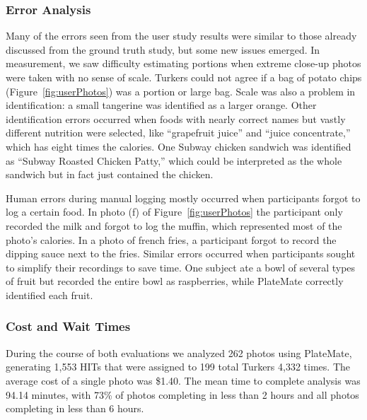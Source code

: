 \subsubsection{Error Analysis}
Many of the errors seen from the user study results were similar to those already discussed from the ground truth study, but some new issues emerged.  In measurement, we saw difficulty estimating portions when extreme close-up photos were taken with no sense of scale.  Turkers could not agree if a bag of potato chips (Figure~\ref{fig:userPhotos}) was a portion or large bag.  Scale was also a problem in identification: a small tangerine was identified as a larger orange.  Other identification errors occurred when foods with nearly correct names but vastly different nutrition were selected, like ``grapefruit juice'' and ``juice concentrate,'' which has eight times the calories. One Subway chicken sandwich was identified as ``Subway Roasted Chicken Patty,'' which could be interpreted as the whole sandwich but in fact just contained the chicken.

Human errors during manual logging mostly occurred when participants forgot to log a certain food.  In photo (f) of Figure~\ref{fig:userPhotos} the participant only recorded the milk and forgot to log the muffin, which represented most of the photo's calories.  In a photo of french fries, a participant forgot to record the dipping sauce next to the fries.  Similar errors occurred when participants sought to simplify their recordings to save time.  One subject ate a bowl of several types of fruit but recorded the entire bowl as raspberries, while PlateMate correctly identified each fruit.

\subsubsection{Cost and Wait Times}
During the course of both evaluations we analyzed 262 photos using PlateMate, generating 1,553 HITs that were assigned to 199 total Turkers 4,332 times.  The average cost of a single photo was \$1.40.  The mean time to complete analysis was 94.14 minutes, with 73\% of photos completing in less than 2 hours and all photos completing in less than 6 hours.
